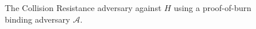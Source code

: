 \begin{figure}[t]
\begin{algorithm}[H]
    \caption{\label{alg.collision-resistance-adversary} The Collision Resistance adversary against $H$ using a proof-of-burn binding adversary $\mathcal{A}$.}
    \begin{algorithmic}[1]
            \State{}
        \EndFunction
    \end{algorithmic}
\end{algorithm}
\end{figure}
